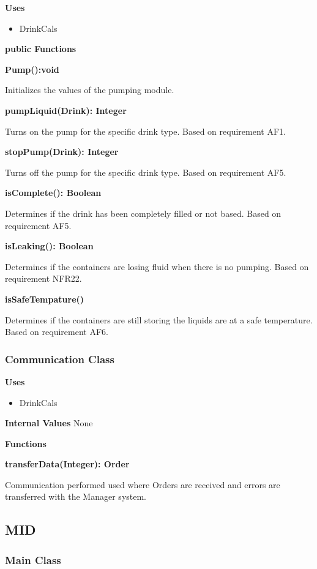 \documentclass [10pt]{article}
\begin{document}
\textbf{Uses}

\begin{itemize}
	\item DrinkCals
\end{itemize}


\textbf{public Functions}

\textbf{Pump():void}

Initializes the values of the pumping module.

\textbf{pumpLiquid(Drink): Integer}

Turns on the pump for the specific drink type. Based on requirement AF1.

\textbf{stopPump(Drink): Integer}

Turns off the pump for the specific drink type. Based on requirement AF5.

\textbf{isComplete(): Boolean}

Determines if the drink has been completely filled or not based. Based on requirement AF5.


\textbf{isLeaking(): Boolean}

Determines if the containers are losing fluid when there is no pumping. Based on requirement NFR22.

\textbf{isSafeTempature()}

Determines if the containers are still storing the liquids are at a safe temperature. Based on requirement AF6.


\subsubsection{Communication Class}

\textbf{Uses}

\begin{itemize}
	\item DrinkCals
\end{itemize}

\textbf{Internal Values}
None

\textbf{Functions}

\textbf{transferData(Integer): Order}

Communication performed used  where Orders are received and errors are transferred with the Manager system.


\subsection{MID}

\subsubsection{Main Class}
\end{document}
